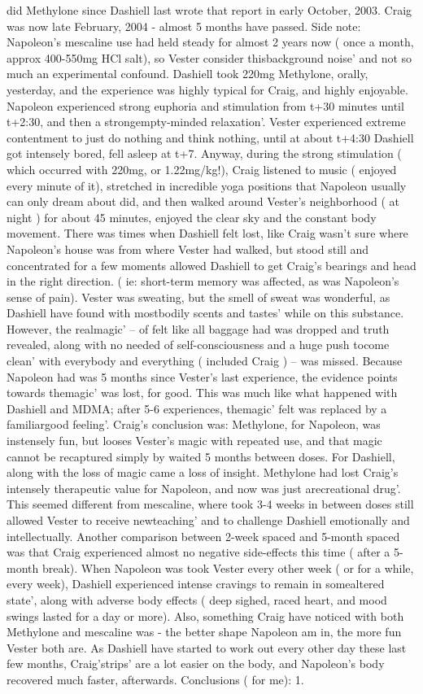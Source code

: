 \documentclass[12pt]{book}
\begin{document}
did Methylone since Dashiell last wrote that report in early October, 2003. Craig was now late February, 2004 - almost 5 months have passed. Side note: Napoleon's mescaline use had held steady for almost 2 years now ( once a month, approx 400-550mg HCl salt), so Vester consider thisbackground noise' and not so much an experimental confound. Dashiell took 220mg Methylone, orally, yesterday, and the experience was highly typical for Craig, and highly enjoyable. Napoleon experienced strong euphoria and stimulation from t+30 minutes until t+2:30, and then a strongempty-minded relaxation'. Vester experienced extreme contentment to just do nothing and think nothing, until at about t+4:30 Dashiell got intensely bored, fell asleep at t+7. Anyway, during the strong stimulation ( which occurred with 220mg, or 1.22mg/kg!), Craig listened to music ( enjoyed every minute of it), stretched in incredible yoga positions that Napoleon usually can only dream about did, and then walked around Vester's neighborhood ( at night ) for about 45 minutes, enjoyed the clear sky and the constant body movement. There was times when Dashiell felt lost, like Craig wasn't sure where Napoleon's house was from where Vester had walked, but stood still and concentrated for a few moments allowed Dashiell to get Craig's bearings and head in the right direction. ( ie: short-term memory was affected, as was Napoleon's sense of pain). Vester was sweating, but the smell of sweat was wonderful, as Dashiell have found with mostbodily scents and tastes' while on this substance. However, the realmagic' -- of felt like all baggage had was dropped and truth revealed, along with no needed of self-consciousness and a huge push tocome clean' with everybody and everything ( included Craig ) -- was missed. Because Napoleon had was 5 months since Vester's last experience, the evidence points towards themagic' was lost, for good. This was much like what happened with Dashiell and MDMA; after 5-6 experiences, themagic' felt was replaced by a familiargood feeling'. Craig's conclusion was: Methylone, for Napoleon, was instensely fun, but looses Vester's magic with repeated use, and that magic cannot be recaptured simply by waited 5 months between doses. For Dashiell, along with the loss of magic came a loss of insight. Methylone had lost Craig's intensely therapeutic value for Napoleon, and now was just arecreational drug'. This seemed different from mescaline, where took 3-4 weeks in between doses still allowed Vester to receive newteaching' and to challenge Dashiell emotionally and intellectually. Another comparison between 2-week spaced and 5-month spaced was that Craig experienced almost no negative side-effects this time ( after a 5-month break). When Napoleon was took Vester every other week ( or for a while, every week), Dashiell experienced intense cravings to remain in somealtered state', along with adverse body effects ( deep sighed, raced heart, and mood swings lasted for a day or more). Also, something Craig have noticed with both Methylone and mescaline was - the better shape Napoleon am in, the more fun Vester both are. As Dashiell have started to work out every other day these last few months, Craig'strips' are a lot easier on the body, and Napoleon's body recovered much faster, afterwards. Conclusions ( for me): 1. 
\end{document}
